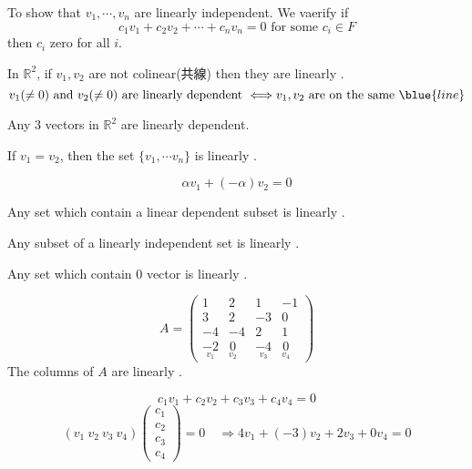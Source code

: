 
\begin{remark}[1]
    To show that $v_1, \cdots , v_n$ are linearly independent. We vaerify if 
    \[
        c_1 v_1 + c_2 v_2 + \cdots + c_n v_n = 0 \text{ for some } c_i \in F
    \]
    then $c_i$  zero for all $i$.
\end{remark}

\begin{eg}
In $\mathbb{R}^2$, if $v_1, v_2$ are not colinear(共線) then they are linearly . 
\[
v_1(\neq 0) \text{ and } v_2(\neq 0) \text{ are linearly dependent } \Longleftrightarrow v_1, v_2 \text{ are on the same } \blue{line}
\]


Any 3 vectors in $\mathbb{R}^2$ are linearly dependent.
\end{eg}

\begin{remark}[2]
    If $v_1 = v_2$, then the set $\{v_1, \cdots v_n\}$ is linearly .

    \[
        \alpha v_1 + (-\alpha) v_2 = 0
    \]
\end{remark}

\begin{remark}[3]
    Any set which contain a linear dependent subset is linearly .
\end{remark}

\begin{remark}[4]
    Any subset of a linearly independent set is linearly .
\end{remark}

\begin{remark}[5]
    Any set which contain 0 vector is linearly .
\end{remark}

\begin{eg}
    \[
        A = \begin{pmatrix}
            1 & 2 & 1 & -1 \\
            3 & 2 & -3 & 0 \\
            -4 & -4 & 2 & 1 \\
            \underset{v_1}{-2} & \underset{v_2}{0} & \underset{v_3}{-4} & \underset{v_4}{0}
        \end{pmatrix}
    \]
    The columns of $A$ are linearly .
\end{eg}

\[
    c_1 v_1 + c_2 v_2 + c_3 v_3 + c_4 v_4 = 0
\]
\[
    (v_1\ v_2\ v_3\ v_4) \begin{pmatrix}
        c_1 \\ c_2 \\ c_3 \\ c_4
    \end{pmatrix} = 0 \quad \Longrightarrow 4v_1 + (-3)v_2 + 2v_3 + 0v_4 = 0
\]

